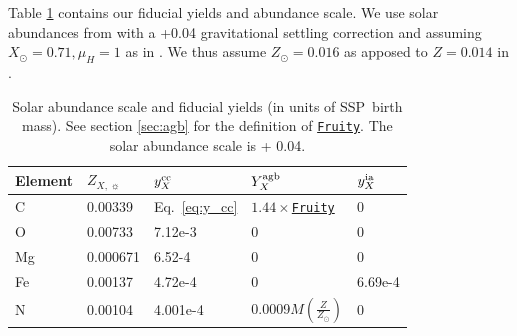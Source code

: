 \documentclass[fleqn,
usenatbib]{mnras}
\newcommand{\fruity}{\texttt{\hyperlink{fruity}{Fruity}}}
\newcommand{\cfactor}{1.44}
\newcommand{\y}{Y}
\begin{document}
Table \ref{tab:fiducial_mod} contains our fiducial yields and abundance scale. We use solar abundances from \citet{magg+22} with a +0.04 gravitational settling correction  and assuming $X_\odot= 0.71, \mu_{H} = 1$ as in \citet{david_fe}. We thus assume $Z_\odot=0.016$ as apposed to $Z=0.014$ in \citet{asplund+09}.


\begin{table}
	\centering
    \caption[]{Solar abundance scale and fiducial yields (in units of SSP~birth mass). See section \ref{sec:agb} for the definition of \fruity. The solar abundance scale is \citet{magg+22} + 0.04. }
	\label{tab:fiducial_mod}

	\begin{tabular}{l l l l l}
		\hline
        Element & $Z_{X,\,\sun}$ & $y_X^{\rm cc}$ & $\y_X^{\rm agb}$ & $y_X^{\rm ia}$  \\
		\hline
        C & 0.00339 & Eq.~\ref{eq:y_cc} & $\cfactor\times$\fruity &  0 \\
        O & 0.00733 & 7.12e-3 & 0 & 0 \\
        Mg & 0.000671 & 6.52-4 & 0 & 0 \\
        Fe & 0.00137 & 4.72e-4 & 0 & 6.69e-4 \\
        N &0.00104 & 4.001e-4 & 0.0009$M\left(\frac{Z}{Z_\odot}\right)$ & 0\\
		\hline
	\end{tabular}
\end{table}
\end{document}

